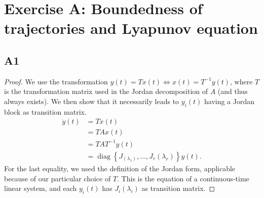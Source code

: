 \documentclass[11pt]{article}
\DeclareMathOperator{\diag}{diag}
\begin{document}
\section*{Exercise A: Boundedness of trajectories and Lyapunov equation}
\subsection*{A1}
\begin{proof}
We use the transformation \(y(t) = T x(t) \iff x(t) = T^{-1} y(t)\), where \(T\) is the transformation matrix used in the Jordan decomposition of \(A\) (and thus always exists).
We then show that it necessarily leads to \(y_i(t)\) having a Jordan block as transition matrix.
\begin{align*}
    \dot{y}(t) &= T \dot{x}(t) \\
    &= T A x(t) \\
    &= T A T^{-1} y(t) \\
    &= \diag\left\{J_(\lambda_1), \dots, J_r(\lambda_r)\right\} y(t).
\end{align*}
For the last equality, we used the definition of the Jordan form, applicable because of our particular choice of \(T\).
This is the equation of a continuous-time linear system, and each \(y_i(t)\) has \(J_i(\lambda_i)\) as transition matrix.
\end{proof}
\end{document}
